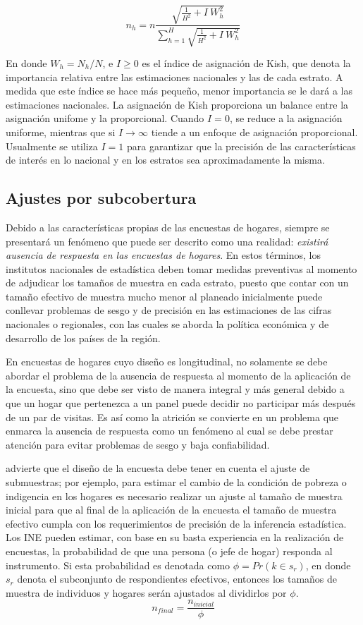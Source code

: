\documentclass[
  12pt,
]{book}
\begin{document}
\[
n_h=n\frac{\sqrt{\frac{1}{H^2}+I\ W_h^2}}{\sum_{h=1}^{H}\sqrt{\frac{1}{H^2}+I\ W_h^2}}
\]

En donde \(W_h=N_h/N\), e \(I \geq 0\) es el índice de asignación de Kish, que denota la importancia relativa entre las estimaciones nacionales y las de cada estrato. A medida que este índice se hace más pequeño, menor importancia se le dará a las estimaciones nacionales. La asignación de Kish proporciona un balance entre la asignación unifome y la proporcional. Cuando \(I=0\), se reduce a la asignación uniforme, mientras que si \(I \rightarrow \infty\) tiende a un enfoque de asignación proporcional. Usualmente se utiliza \(I = 1\) para garantizar que la precisión de las características de interés en lo nacional y en los estratos sea aproximadamente la misma.

\hypertarget{ajustes-por-subcobertura}{%
\subsection{Ajustes por subcobertura}\label{ajustes-por-subcobertura}}

Debido a las características propias de las encuestas de hogares, siempre se presentará un fenómeno que puede ser descrito como una realidad: \emph{existirá ausencia de respuesta en las encuestas de hogares}. En estos términos, los institutos nacionales de estadística deben tomar medidas preventivas al momento de adjudicar los tamaños de muestra en cada estrato, puesto que contar con un tamaño efectivo de muestra mucho menor al planeado inicialmente puede conllevar problemas de sesgo y de precisión en las estimaciones de las cifras nacionales o regionales, con las cuales se aborda la política económica y de desarrollo de los países de la región.

En encuestas de hogares cuyo diseño es longitudinal, no solamente se debe abordar el problema de la ausencia de respuesta al momento de la aplicación de la encuesta, sino que debe ser visto de manera integral y más general debido a que un hogar que pertenezca a un panel puede decidir no participar más después de un par de visitas. Es así como la atrición se convierte en un problema que enmarca la ausencia de respuesta como un fenómeno al cual se debe prestar atención para evitar problemas de sesgo y baja confiabilidad.

\citet{Kalton_2009} advierte que el diseño de la encuesta debe tener en cuenta el ajuste de submuestras; por ejemplo, para estimar el cambio de la condición de pobreza o indigencia en los hogares es necesario realizar un ajuste al tamaño de muestra inicial para que al final de la aplicación de la encuesta el tamaño de muestra efectivo cumpla con los requerimientos de precisión de la inferencia estadística. Los INE pueden estimar, con base en su basta experiencia en la realización de encuestas, la probabilidad de que una persona (o jefe de hogar) responda al instrumento. Si esta probabilidad es denotada como \(\phi=Pr(k \in s_r)\), en donde \(s_r\) denota el subconjunto de respondientes efectivos, entonces los tamaños de muestra de individuos y hogares serán ajustados al dividirlos por \(\phi\).
\[n_{final} = \frac{n_{inicial}}{\phi}\]
\end{document}

